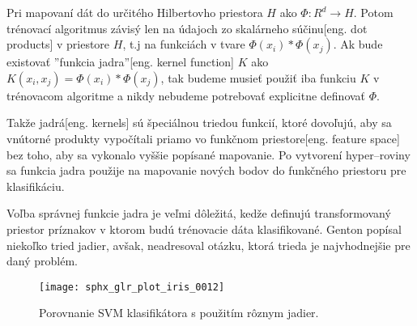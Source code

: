 Pri mapovaní dát do určitého Hilbertovho priestora \cite{prop:HilbertSpace} $H$ ako $\Phi:R^d \rightarrow H$.
Potom trénovací algoritmus závisý len na údajoch zo skalárneho súčinu[eng. dot products] v priestore $H$, t.j na funkciách v tvare $\Phi(x_i) * \Phi(x_j)$.
Ak bude existovať ''funkcia jadra''[eng. kernel function] $K$ ako $K(x_i, x_j) = \Phi(x_i)*\Phi(x_j)$, tak budeme musieť použiť iba funkciu $K$ v trénovacom algoritme
    a nikdy nebudeme potrebovať explicitne definovať $\Phi$\cite{prop:SupervisedMachineLearning}.

Takže jadrá[eng. kernels] sú špeciálnou triedou funkcií, ktoré dovoľujú, aby sa vnútorné produkty vypočítali priamo vo funkčnom priestore[eng. feature space] bez toho, aby sa vykonalo vyššie popísané mapovanie.
Po vytvorení hyper--roviny sa funkcia jadra použije na mapovanie nových bodov do funkčného priestoru pre klasifikáciu\cite{prop:SupervisedMachineLearning}.

Voľba správnej funkcie jadra je veľmi dôležitá, kedže definujú transformovaný priestor príznakov v ktorom budú trénovacie dáta klasifikované.
Genton \cite{prop:KernelClasses} popísal niekoľko tried jadier, avšak, neadresoval otázku, ktorá trieda je najvhodnejšie pre daný problém.

\begin{comment}
    Zoznam populárnych jadier\cite{prop:SupervisedMachineLearning}:
    \begin{equation}
        K(x, y) = (x*y+1)^P
    \end{equation}
    \begin{equation}
        K(x, y) = e^{\frac{-||x-y||^2}{2 \sigma^2}}
    \end{equation}
    \begin{equation}
        K(x, y) = tanh(\kappa x*y - \delta)^P
    \end{equation}
\end{comment}


\begin{figure}[H]
	\centering
	\texttt{[image: sphx\_glr\_plot\_iris\_0012]}
	\caption{Porovnanie SVM klasifikátora s použitím rôznym jadier\cite{odkaz:SVMImage}.}
	\label{pic:SVMComparison}
\end{figure}



